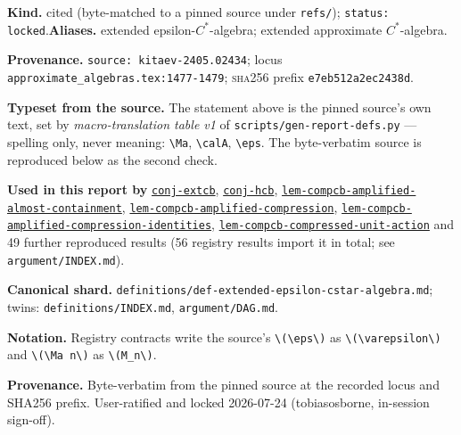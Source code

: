 \begin{defnote}
\textbf{Kind.} cited (byte-matched to a pinned source under \texttt{refs/}); \texttt{status: locked}.\quad\textbf{Aliases.} extended epsilon-$C^{*}$-algebra; extended approximate $C^{*}$-algebra.
\par
\textbf{Provenance.} \texttt{source: kitaev-\allowbreak{}2405.\allowbreak{}02434}; locus \texttt{approximate\_algebras.\allowbreak{}tex:\allowbreak{}1477-\allowbreak{}1479}; \textsc{sha256} prefix \texttt{e7eb512a2ec2438d}.
\par
\textbf{Typeset from the source.} The statement above is the pinned source's own text, set by \emph{macro-translation table v1} of \texttt{scripts/gen-report-defs.py} --- spelling only, never meaning: \texttt{\textbackslash{}Ma}, \texttt{\textbackslash{}calA}, \texttt{\textbackslash{}eps}. The byte-verbatim source is reproduced below as the second check.
\par
\textbf{Used in this report by} \hyperref[conj:extcb]{\texttt{conj-\allowbreak{}extcb}}, \hyperref[conj:hcb]{\texttt{conj-\allowbreak{}hcb}}, \hyperref[lem:compcb-amplified-almost-containment]{\texttt{lem-\allowbreak{}compcb-\allowbreak{}amplified-\allowbreak{}almost-\allowbreak{}containment}}, \hyperref[lem:compcb-amplified-compression]{\texttt{lem-\allowbreak{}compcb-\allowbreak{}amplified-\allowbreak{}compression}}, \hyperref[lem:compcb-amplified-compression-identities]{\texttt{lem-\allowbreak{}compcb-\allowbreak{}amplified-\allowbreak{}compression-\allowbreak{}identities}}, \hyperref[lem:compcb-compressed-unit-action]{\texttt{lem-\allowbreak{}compcb-\allowbreak{}compressed-\allowbreak{}unit-\allowbreak{}action}} and 49 further reproduced results (56 registry results import it in total; see \texttt{argument/INDEX.md}).
\par
\textbf{Canonical shard.} \texttt{definitions/\allowbreak{}def-\allowbreak{}extended-\allowbreak{}epsilon-\allowbreak{}cstar-\allowbreak{}algebra.\allowbreak{}md}; twins: \texttt{definitions/INDEX.md}, \texttt{argument/DAG.md}.
\par
\textbf{Notation.} Registry contracts write the source's \texttt{\textbackslash{}(\textbackslash{}eps\textbackslash{})} as
\texttt{\textbackslash{}(\textbackslash{}varepsilon\textbackslash{})} and \texttt{\textbackslash{}(\textbackslash{}Ma n\textbackslash{})} as \texttt{\textbackslash{}(M\_n\textbackslash{})}.

\textbf{Provenance.} Byte-verbatim from the pinned source at the recorded locus and
SHA256 prefix.  User-ratified and locked 2026-07-24 (tobiasosborne, in-session sign-off).
\end{defnote}
